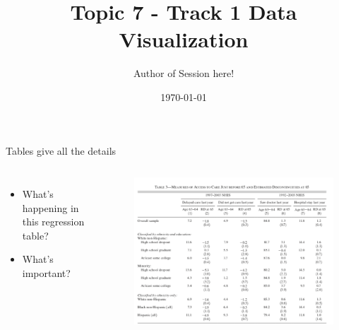 \documentclass[aspectratio=169]{beamer}
\title{Topic 7 - Track 1 \newline Data Visualization}
\date{\today}
\author{Author of Session here!} %
\institute{Development Impact Evaluation (DIME) \newline The World Bank }
\begin{document}
	{
		\maketitle
	}

\begin{frame}[fragile]{Tables give all the details}
	\begin{columns}[c]
		\begin{itemize}
			\item What’s happening in this regression table?
			\item What’s important?
		\end{itemize}
		\begin{figure}
			\centering
			\includegraphics[width=\linewidth]{img/regtable}
		\end{figure}
	\end{columns}
\end{frame}
\end{document}
